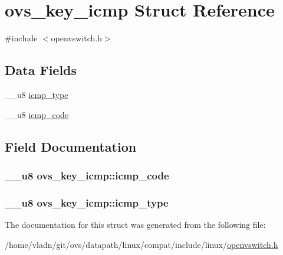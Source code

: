 \hypertarget{structovs__key__icmp}{}\section{ovs\+\_\+key\+\_\+icmp Struct Reference}
\label{structovs__key__icmp}


{\ttfamily \#include $<$openvswitch.\+h$>$}

\subsection*{Data Fields}
\begin{DoxyCompactItemize}
\item 
\+\_\+\+\_\+u8 \hyperlink{structovs__key__icmp_aa1880a0c32ed20143e19948c0169060a}{icmp\+\_\+type}
\item 
\+\_\+\+\_\+u8 \hyperlink{structovs__key__icmp_ae65b58144b376be4a05f68e7e979497d}{icmp\+\_\+code}
\end{DoxyCompactItemize}


\subsection{Field Documentation}
\hypertarget{structovs__key__icmp_ae65b58144b376be4a05f68e7e979497d}{}
\subsubsection[{icmp\+\_\+code}]{\setlength{\rightskip}{0pt plus 5cm}\+\_\+\+\_\+u8 ovs\+\_\+key\+\_\+icmp\+::icmp\+\_\+code}\label{structovs__key__icmp_ae65b58144b376be4a05f68e7e979497d}
\hypertarget{structovs__key__icmp_aa1880a0c32ed20143e19948c0169060a}{}
\subsubsection[{icmp\+\_\+type}]{\setlength{\rightskip}{0pt plus 5cm}\+\_\+\+\_\+u8 ovs\+\_\+key\+\_\+icmp\+::icmp\+\_\+type}\label{structovs__key__icmp_aa1880a0c32ed20143e19948c0169060a}


The documentation for this struct was generated from the following file\+:\begin{DoxyCompactItemize}
\item 
/home/vladn/git/ovs/datapath/linux/compat/include/linux/\hyperlink{openvswitch_8h}{openvswitch.\+h}\end{DoxyCompactItemize}
